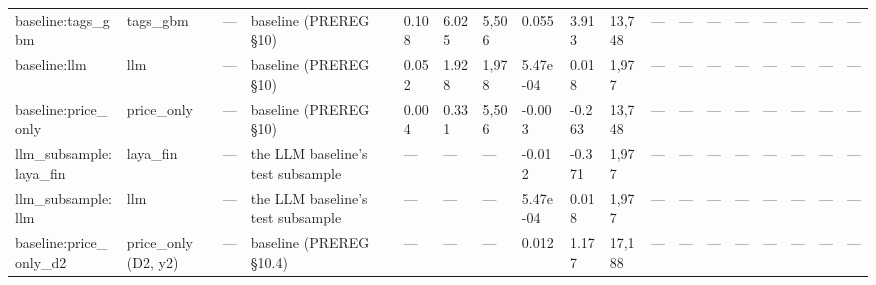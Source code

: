 \begin{tabular}{llllllllllllllllll}
baseline:tags\_gbm & tags\_gbm & — & baseline (PREREG §10) & 0.108 & 6.025 & 5,506 & 0.055 & 3.913 & 13,748 & — & — & — & — & — & — & — & — \\
baseline:llm & llm & — & baseline (PREREG §10) & 0.052 & 1.928 & 1,978 & 5.47e-04 & 0.018 & 1,977 & — & — & — & — & — & — & — & — \\
baseline:price\_only & price\_only & — & baseline (PREREG §10) & 0.004 & 0.331 & 5,506 & -0.003 & -0.263 & 13,748 & — & — & — & — & — & — & — & — \\
llm\_subsample:laya\_fin & laya\_fin & — & the LLM baseline's test subsample & — & — & — & -0.012 & -0.371 & 1,977 & — & — & — & — & — & — & — & — \\
llm\_subsample:llm & llm & — & the LLM baseline's test subsample & — & — & — & 5.47e-04 & 0.018 & 1,977 & — & — & — & — & — & — & — & — \\
baseline:price\_only\_d2 & price\_only (D2, y2) & — & baseline (PREREG §10.4) & — & — & — & 0.012 & 1.177 & 17,188 & — & — & — & — & — & — & — & — \\
\bottomrule
\end{tabular}
